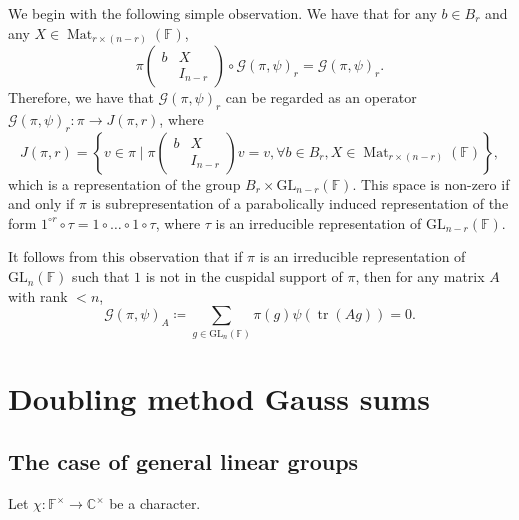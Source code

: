 \documentclass[12pt, reqno]{amsart}
\theoremstyle{definition}
\theoremstyle{definition}
\theoremstyle{definition}
\newcommand{\cComplex}{\mathbb{C}}
\newcommand{\multiplicativegroup}[1]{#1^{\times}}
\newcommand{\fieldCharacter}{\psi}
\newcommand{\IdentityMatrix}[1]{I_{#1}}
\newcommand{\trace}{\operatorname{tr}}
\newcommand{\GL}{\mathrm{GL}}
\newcommand{\finiteField}{\mathbb{F}}
\newcommand{\Mat}[2]{\operatorname{Mat}_{#1 \times #2}}
\newcommand{\GaussSum}[2]{\mathcal{G}\left(#1, #2\right)}
\begin{document}
We begin with the following simple observation. We have that for any $b \in B_r$ and any $X \in \Mat{r}{(n-r)}\left(\finiteField\right)$,
$$ \pi\begin{pmatrix}
b & X\\
& \IdentityMatrix{n-r}
\end{pmatrix} \circ \GaussSum{\pi}{\fieldCharacter}_r = \GaussSum{\pi}{\fieldCharacter}_r.$$
Therefore, we have that $\GaussSum{\pi}{\fieldCharacter}_r$ can be regarded as an operator $\GaussSum{\pi}{\fieldCharacter}_r \colon \pi \to J\left(\pi, r\right)$, where $$J\left(\pi, r\right) = \left\{ v \in \pi \mid \pi \begin{pmatrix}
	b & X\\
	& \IdentityMatrix{n-r}
\end{pmatrix} v = v, \forall b \in B_r, X \in \Mat{r}{(n-r)}\left(\finiteField\right) \right\},$$
which is a representation of the group $B_r \times \GL_{n-r}\left(\finiteField\right)$. This space is non-zero if and only if $\pi$ is subrepresentation of a parabolically induced representation of the form $1^{\circ r} \circ \tau = 1 \circ \dots \circ 1 \circ \tau$, where $\tau$ is an irreducible representation of $\GL_{n-r}\left(\finiteField\right)$. 

It follows from this observation that if $\pi$ is an irreducible representation of $\GL_n\left(\finiteField\right)$ such that $1$ is not in the cuspidal support of $\pi$, then for any matrix $A$ with rank $< n$, 
$$\GaussSum{\pi}{\fieldCharacter}_A \coloneqq \sum_{g \in \GL_n\left(\finiteField\right)} \pi\left(g\right) \fieldCharacter\left(\trace\left(A g\right)\right) = 0.$$

\section{Doubling method Gauss sums}

\subsection{The case of general linear groups}

Let $\chi \colon \multiplicativegroup{\finiteField} \to \multiplicativegroup{\cComplex}$ be a character.
\end{document}

